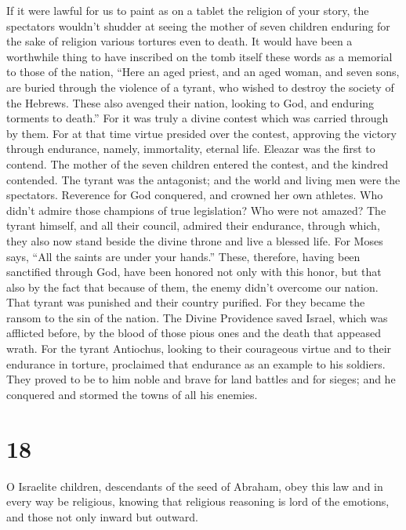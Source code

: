  If it were lawful for us to paint as on a tablet the
religion of your story, the spectators wouldn't shudder at seeing the
mother of seven children enduring for the sake of religion various
tortures even to death.  It would have been a worthwhile
thing to have inscribed on the tomb itself these words as a memorial to
those of the nation,  ``Here an aged priest, and an aged
woman, and seven sons, are buried through the violence of a tyrant, who
wished to destroy the society of the Hebrews.  These also
avenged their nation, looking to God, and enduring torments to death.''
 For it was truly a divine contest which was carried
through by them.  For at that time virtue presided over the
contest, approving the victory through endurance, namely, immortality,
eternal life.  Eleazar was the first to contend. The mother
of the seven children entered the contest, and the kindred contended.
 The tyrant was the antagonist; and the world and living
men were the spectators.  Reverence for God conquered, and
crowned her own athletes.  Who didn't admire those
champions of true legislation? Who were not amazed?  The
tyrant himself, and all their council, admired their endurance,
 through which, they also now stand beside the divine
throne and live a blessed life.  For Moses says, ``All the
saints are under your hands.''  These, therefore, having
been sanctified through God, have been honored not only with this honor,
but that also by the fact that because of them, the enemy didn't
overcome our nation.  That tyrant was punished and their
country purified.  For they became the ransom to the sin of
the nation. The Divine Providence saved Israel, which was afflicted
before, by the blood of those pious ones and the death that appeased
wrath.  For the tyrant Antiochus, looking to their
courageous virtue and to their endurance in torture, proclaimed that
endurance as an example to his soldiers.  They proved to be
to him noble and brave for land battles and for sieges; and he conquered
and stormed the towns of all his enemies.

\hypertarget{section-17}{%
\section{18}\label{section-17}}

 O Israelite children, descendants of the seed of Abraham,
obey this law and in every way be religious,  knowing that
religious reasoning is lord of the emotions, and those not only inward
but outward.

